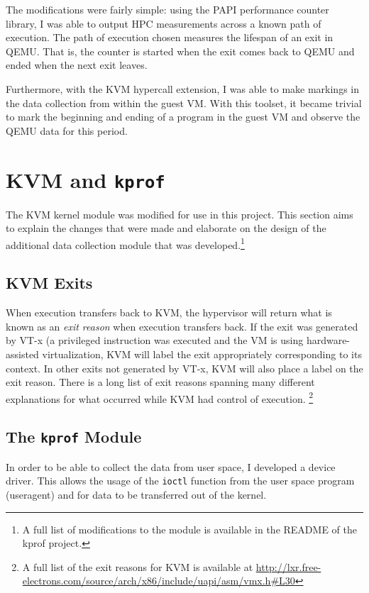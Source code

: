 \documentclass[notitlepage]{article}
\begin{document}
The modifications were fairly simple: using the PAPI performance counter
library, I was able to output HPC measurements across a known path of execution.
The path of execution chosen measures the lifespan of an exit in QEMU. That is,
the counter is started when the exit comes back to QEMU and ended when the next
exit leaves.

Furthermore, with the KVM hypercall extension, I was able to make markings in
the data collection from within the guest VM. With this toolset, it became
trivial to mark the beginning and ending of a program in the guest VM and
observe the QEMU data for this period.


\section{KVM and \texttt{kprof}}
\label{sec:kvm}
The KVM kernel module was modified for use in this project. This section aims to
explain the changes that were made and elaborate on the design of the additional
data collection module that was developed.\footnote{A full list of modifications
to the module is available in the README of the kprof project.}

\subsection{KVM Exits}
When execution transfers back to KVM, the hypervisor will return what is known
as an \textit{exit reason} when execution transfers back. If the exit was
generated by VT-x (a privileged instruction was executed and the VM is using
hardware-assisted virtualization, KVM will label the exit appropriately
corresponding to its context. In other exits not generated by VT-x, KVM will
also place a label on the exit reason. There is a long list of exit reasons
spanning many different explanations for what occurred while KVM had control of
execution. \footnote{A full list of the exit reasons for KVM is available at
\url{http://lxr.free-electrons.com/source/arch/x86/include/uapi/asm/vmx.h\#L30}}

\subsection{The \texttt{kprof} Module}
In order to be able to collect the data from user space, I developed a device
driver. This allows the usage of the \texttt{ioctl} function from the user space
program (useragent) and for data to be transferred out of the kernel.
\end{document}
